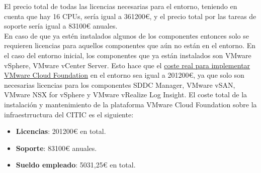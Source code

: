 El precio total de todas las licencias necesarias para el entorno, teniendo en cuenta que hay 16 CPUs, sería igual a 361200€, y el precio total por las tareas de soporte sería igual a 83100€ anuales.\\

En caso de que ya estén instalados algunos de los componentes entonces solo se requieren licencias para aquellos componentes que aún no están en el entorno. En el caso del entorno inicial, los componentes que ya están instalados son VMware vSphere, VMware vCenter Server. Esto hace que el \underline{coste real para implementar VMware Cloud Foundation} en el entorno sea igual a 201200€, ya que solo son necesarias licencias para los componentes SDDC Manager, VMware vSAN, VMware NSX for vSphere y VMware vRealize Log Insight. El coste total de la instalación y mantenimiento de la plataforma VMware Cloud Foundation sobre la infraestrructura del CITIC es el siguiente:

    \begin{itemize}
        \item \textbf{Licencias}: 201200€ en total.
        \item \textbf{Soporte}: 83100€ anuales.
        \item \textbf{Sueldo empleado}: 5031,25€ en total.
    \end{itemize}


